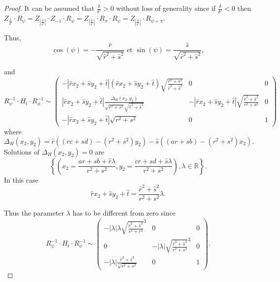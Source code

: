 \begin{proof}
\noindent It can be assumed that $\frac{\delta}{\delta'}>0$ without loss of generality since
if $\frac{\delta}{\delta'}<0$ then $Z_{\frac{\delta}{\delta'}} \cdot R_{\psi}=Z_{\left|\frac{\delta}{\delta'}\right|}\cdot Z_{-1} \cdot R_{\psi}=Z_{\left|\frac{\delta}{\delta'}\right|}\cdot R_{\pi} \cdot R_{\psi}=Z_{\left|\frac{\delta}{\delta'}\right|}\cdot R_{\psi+\pi}$.

\noindent Thus,
 \begin{equation*}
  \cos( \psi ) =- \frac{\hat r}{\sqrt{\hat r^2 + \hat s^2}} \text{ et } \sin( \psi ) = \frac{\hat s}{\sqrt{\hat r^2 + \hat s^2}},
 \end{equation*}

\noindent and
\begin{equation*}
R_{\psi}^{-1} \cdot H_t \cdot R_{\phi}^{-1} \sim 
 \begin{pmatrix}
 -|\hat r x_2 +\hat s y_2 +\hat t|(\hat r x_2 +\hat s y_2 +\hat t)\sqrt{\frac{r^2 + s^2}{\hat r^2 + \hat s^2}}&0&0\\
 |\hat r x_2 +\hat s y_2 +\hat t|\frac{\Delta_H(x_2 , y_2)}{\sqrt{r^2 + s^2}\sqrt{\hat r^2 + \hat s^2}}&-|\hat r x_2 +\hat s y_2 +\hat t|\sqrt{\frac{\hat r^2 + \hat s^2}{r^2 + s^2}}&0\\
 -|\hat r x_2 +\hat s y_2 +\hat t|\sqrt{r^2 + s^2}&0&1
 \end{pmatrix}
\end{equation*}
where 
\begin{equation*}
\Delta_H(x_2 , y_2 ) =\hat r ((rc+sd)-(r^2 + s^2)y_2) - \hat s ((ar+sb)-(r^2 + s^2 )x_2).
\end{equation*}
Solutions of $\Delta_H(x_2 , y_2 )=0$ are 
\[ \left\lbrace \left( x_2=\frac{ar+sb+ \hat r \lambda}{r^2 +s^2}, y_2=\frac{cr+sd+\hat s \lambda}{r^2 +s^2}\right), \lambda \in \mathbb R \right\rbrace.\]
In this case
\begin{equation*}
\hat r x_2 +\hat s y_2 +\hat t = \frac{\hat r^2 +\hat s^2}{r^2 + s^2} \lambda.
\end{equation*}

\noindent Thus the parameter $\lambda$ has to be different from zero since
\begin{equation*}
R_{\psi}^{-1} \cdot H_t \cdot R_{\phi}^{-1} \sim 
 \begin{pmatrix}
 -| \lambda | \lambda \sqrt{\frac{\hat r^2 + \hat s^2}{s^2 + r^2}}^{3}&0&0\\
0&-| \lambda | \sqrt{\frac{\hat r^2 + \hat s^2}{r^2 + s^2}}^{3}&0\\
 -|\lambda|\frac{\hat r^2 + \hat s^2}{\sqrt{r^2 + s^2}}&0&1
 \end{pmatrix}.
\end{equation*}
 

\end{proof}
